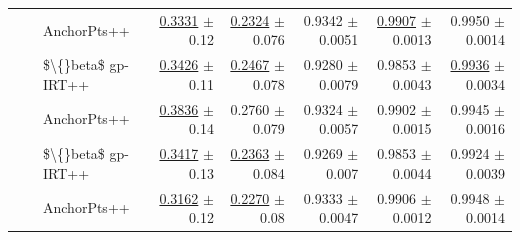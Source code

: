 \begin{longtable}{llp{}rrrrr}
 &  & AnchorPts++ & \underline{0.3331} {\scriptsize $\pm$ 0.12} & \underline{0.2324} {\scriptsize $\pm$ 0.076} & 0.9342 {\scriptsize $\pm$ 0.0051} & \underline{0.9907} {\scriptsize $\pm$ 0.0013} & 0.9950 {\scriptsize $\pm$ 0.0014} \\
 &  & \$\textbackslash\{\}beta\$ gp-IRT++ & \underline{0.3426} {\scriptsize $\pm$ 0.11} & \underline{0.2467} {\scriptsize $\pm$ 0.078} & 0.9280 {\scriptsize $\pm$ 0.0079} & 0.9853 {\scriptsize $\pm$ 0.0043} & \underline{0.9936} {\scriptsize $\pm$ 0.0034} \\
 &  & AnchorPts++ & \underline{0.3836} {\scriptsize $\pm$ 0.14} & 0.2760 {\scriptsize $\pm$ 0.079} & 0.9324 {\scriptsize $\pm$ 0.0057} & 0.9902 {\scriptsize $\pm$ 0.0015} & 0.9945 {\scriptsize $\pm$ 0.0016} \\
 &  & \$\textbackslash\{\}beta\$ gp-IRT++ & \underline{0.3417} {\scriptsize $\pm$ 0.13} & \underline{0.2363} {\scriptsize $\pm$ 0.084} & 0.9269 {\scriptsize $\pm$ 0.007} & 0.9853 {\scriptsize $\pm$ 0.0044} & 0.9924 {\scriptsize $\pm$ 0.0039} \\
 &  & AnchorPts++ & \underline{0.3162} {\scriptsize $\pm$ 0.12} & \underline{0.2270} {\scriptsize $\pm$ 0.08} & 0.9333 {\scriptsize $\pm$ 0.0047} & 0.9906 {\scriptsize $\pm$ 0.0012} & 0.9948 {\scriptsize $\pm$ 0.0014} \\
\end{longtable}